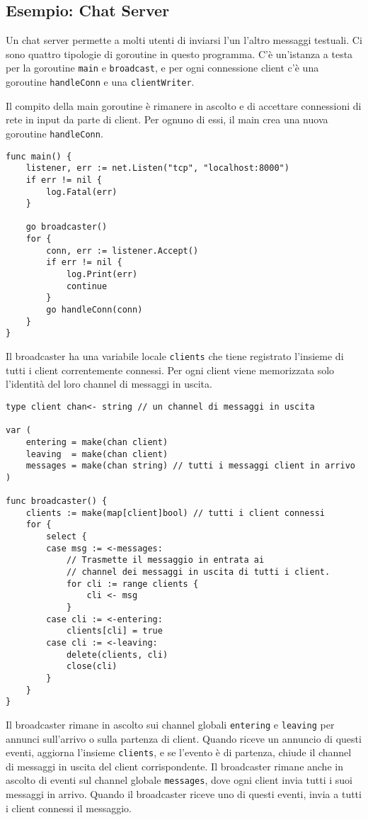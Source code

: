 \documentclass[../../thesis.tex]{subfiles}
\begin{document}
    \clearpage
    \newpage

    \subsection{Esempio: Chat Server}\label{subsec:esempio:-chat-server}
    Un chat server permette a molti utenti di inviarsi l'un l'altro messaggi testuali.
    Ci sono quattro tipologie di goroutine in questo programma.
    C'è un'istanza a testa per la goroutine \verb"main" e \verb"broadcast", e per ogni connessione client c'è una goroutine \verb"handleConn" e una \verb"clientWriter".
    \hfill \vspace{12pt}

    Il compito della main goroutine è rimanere in ascolto e di accettare connessioni di rete in input da parte di client.
    Per ognuno di essi, il main crea una nuova goroutine \verb"handleConn".
    \begin{lstlisting}[frame = single, label = {lst:lstlisting7-10.1}]
func main() {
    listener, err := net.Listen("tcp", "localhost:8000")
    if err != nil {
        log.Fatal(err)
    }

    go broadcaster()
    for {
        conn, err := listener.Accept()
        if err != nil {
            log.Print(err)
            continue
        }
        go handleConn(conn)
    }
}
    \end{lstlisting}
    Il broadcaster ha una variabile locale \verb"clients" che tiene registrato l'insieme di tutti i client correntemente connessi.
    Per ogni client viene memorizzata solo l'identità del loro channel di messaggi in uscita.
    \begin{lstlisting}[frame = single, label = {lst:lstlisting7-10.2}]
type client chan<- string // un channel di messaggi in uscita

var (
    entering = make(chan client)
    leaving  = make(chan client)
    messages = make(chan string) // tutti i messaggi client in arrivo
)

func broadcaster() {
    clients := make(map[client]bool) // tutti i client connessi
    for {
        select {
        case msg := <-messages:
            // Trasmette il messaggio in entrata ai
            // channel dei messaggi in uscita di tutti i client.
            for cli := range clients {
                cli <- msg
            }
        case cli := <-entering:
            clients[cli] = true
        case cli := <-leaving:
            delete(clients, cli)
            close(cli)
        }
    }
}
    \end{lstlisting}
    Il broadcaster rimane in ascolto sui channel globali \verb"entering" e \verb"leaving" per annunci sull'arrivo o sulla partenza di client.
    Quando riceve un annuncio di questi eventi, aggiorna l'insieme \verb"clients", e se l'evento è di partenza, chiude il channel di messaggi in uscita del client corrispondente.
    Il broadcaster rimane anche in ascolto di eventi sul channel globale \verb"messages", dove ogni client invia tutti i suoi messaggi in arrivo.
    Quando il broadcaster riceve uno di questi eventi, invia a tutti i client connessi il messaggio.
    \hfill \vspace{12pt}
\end{document}
